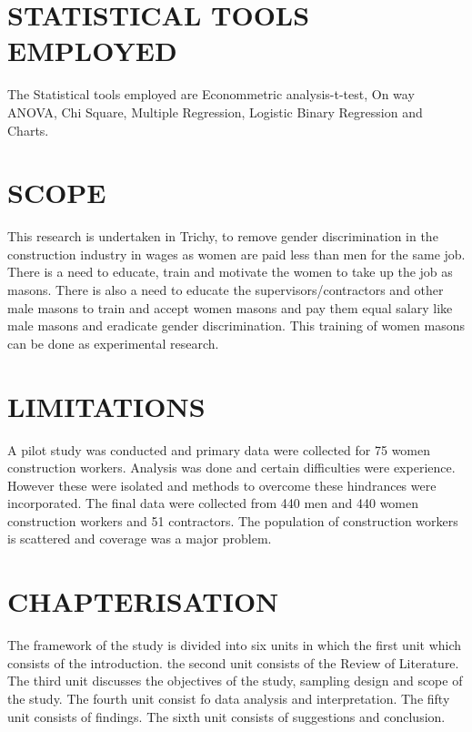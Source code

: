 \documentclass[12pt]{report}
\begin{document}
	\section{STATISTICAL TOOLS EMPLOYED}
	The Statistical tools employed are Econommetric analysis-t-test, On way ANOVA, Chi Square, Multiple Regression, Logistic Binary Regression and Charts.
	
	\section{SCOPE}
	This research is undertaken in Trichy, to remove gender discrimination in the construction industry in wages as women are paid less than men for the same job. There is a need to educate, train and motivate the women to take up the job as masons. There is also a need to educate the supervisors/contractors and other male masons to train and accept women masons and pay them equal salary like male masons and eradicate gender discrimination. This training of women masons can be done as experimental research.
	
	\section{LIMITATIONS}
	A pilot study was conducted and primary data were collected for 75 women construction workers. Analysis was done and certain difficulties were experience. However these were isolated and methods to overcome these hindrances were incorporated. The final data were collected from 440 men and 440 women construction workers and 51 contractors. The population of construction workers is scattered and coverage was a major problem.
	
	\section{CHAPTERISATION}
	The framework of the study is divided into six units in which the first unit which consists of the introduction. the second unit consists of the Review of Literature. The third unit discusses the objectives of the study, sampling design and scope of the study. The fourth unit consist fo data analysis and interpretation. The fifty unit consists of findings. The sixth unit consists of suggestions and conclusion.
	
\end{document}
